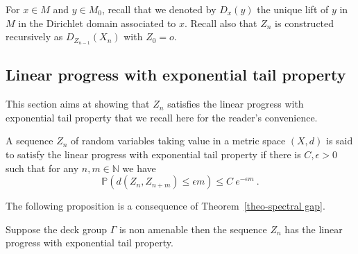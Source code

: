 \documentclass[AHL,Unicode,longabstracts,published]{cedram}
\newcommand{\PP}{\mathbb{P}}
\newcommand{\NN}{\mathbb{N}}
\newcommand{\G}{\Gamma}
\begin{document}
For $x \in M$ and $y \in M_0$, recall that we denoted by $D_x(y)$ the unique lift of $y$ in $M$ in the Dirichlet domain associated to $x$. Recall also that $Z_n$ is constructed recursively as $D_{Z_{n-1}}(X_n)$ with $Z_0=o$.



\subsection{Linear progress with exponential tail property}\label{subsec.linearprogresswithexp}
This section aims at showing that $Z_n$ satisfies the linear progress with exponential tail property that we recall here for the reader's convenience.

\begin{defi}
A sequence $Z_n$ of random variables taking value in a metric space $(X,d)$ is said to satisfy the linear progress with exponential tail property if there is $C, \epsilon > 0$ such that for any $n,m \in \NN$ we have
\[
\PP\left(d\left(Z_n, Z_{n+m}\right) \le \epsilon m\right) \le C \ e^{-\epsilon m} \ .
\]
\end{defi}

The following proposition is a consequence of Theorem~\ref{theo-spectral gap}.

\begin{prop}\label{prop-linearprogress}
Suppose the deck group $\G$ is non amenable then the sequence $Z_n$ has the linear progress with exponential tail property.
\end{prop}
\end{document}
